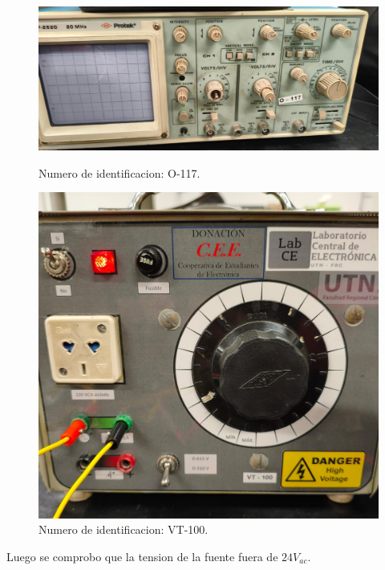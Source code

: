 \documentclass[chaptersright]{informeutn}
\begin{document}
    \begin{figure}[H]
    \centering
    \begin{minipage}{0.45\textwidth}
    \centering
    \includegraphics[width=\textwidth]{pictures/osciloscopio_utilizado_zener.jpeg}
    \caption{Numero de identificacion: O-117.}
    \end{minipage}
    \hspace{0.05\textwidth}
    \begin{minipage}{0.4\textwidth}
    \centering
    \includegraphics[width=\textwidth]{pictures/fuente_alterna_utilizada.jpeg}
    \caption{Numero de identificacion: VT-100.}
    \end{minipage}
    \end{figure}

    Luego se comprobo que la tension de la fuente fuera de $24 V_{ac}$.
    
\end{document}
